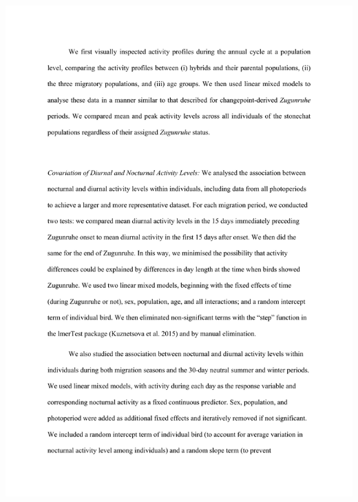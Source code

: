 \documentclass[a4paper, twoside]{templates/ociamthesis}
\begin{document}
\includegraphics[width=1\linewidth]{pdf_chapters/zug/zug_supp_crop_Part08}
\end{document}
